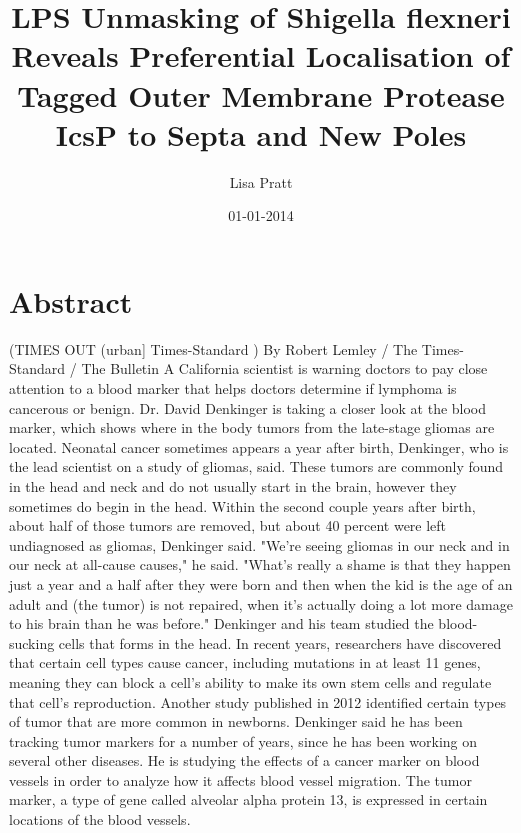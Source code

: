 \documentclass{article}%
\title{LPS Unmasking of Shigella flexneri Reveals Preferential Localisation of Tagged Outer Membrane Protease IcsP to Septa and New Poles}%
\author{Lisa Pratt}%
\affil{The Johns Hopkins Oncology Center, Program in Human Genetics, and The Howard Hughes Medical Institute, The Johns Hopkins University School of Medicine, 424 N. Bond Street, Baltimore, 21231, Maryland, USA}%
\date{01{-}01{-}2014}%
\begin{document}
%
\normalsize%
\maketitle%
\section{Abstract}%
\label{sec:Abstract}%
(TIMES OUT (urban{]} Times{-}Standard )\newline%
By Robert Lemley / The Times{-}Standard / The Bulletin\newline%
A California scientist is warning doctors to pay close attention to a blood marker that helps doctors determine if lymphoma is cancerous or benign.\newline%
Dr. David Denkinger is taking a closer look at the blood marker, which shows where in the body tumors from the late{-}stage gliomas are located.\newline%
Neonatal cancer sometimes appears a year after birth, Denkinger, who is the lead scientist on a study of gliomas, said. These tumors are commonly found in the head and neck and do not usually start in the brain, however they sometimes do begin in the head.\newline%
Within the second couple years after birth, about half of those tumors are removed, but about 40 percent were left undiagnosed as gliomas, Denkinger said.\newline%
"We're seeing gliomas in our neck and in our neck at all{-}cause causes," he said. "What's really a shame is that they happen just a year and a half after they were born and then when the kid is the age of an adult and (the tumor) is not repaired, when it's actually doing a lot more damage to his brain than he was before."\newline%
Denkinger and his team studied the blood{-}sucking cells that forms in the head.\newline%
In recent years, researchers have discovered that certain cell types cause cancer, including mutations in at least 11 genes, meaning they can block a cell's ability to make its own stem cells and regulate that cell's reproduction.\newline%
Another study published in 2012 identified certain types of tumor that are more common in newborns.\newline%
Denkinger said he has been tracking tumor markers for a number of years, since he has been working on several other diseases.\newline%
He is studying the effects of a cancer marker on blood vessels in order to analyze how it affects blood vessel migration. The tumor marker, a type of gene called alveolar alpha protein 13, is expressed in certain locations of the blood vessels.\newline%
\end{document}
